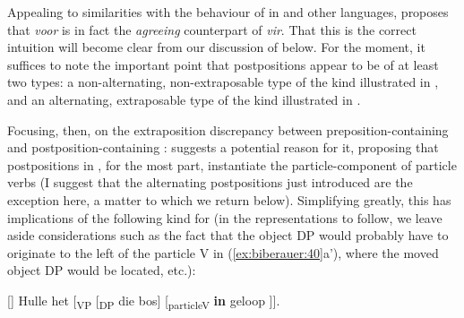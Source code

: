 \documentclass[output=paper]{LSP/langsci}
\begin{document}
Appealing to similarities with the behaviour of  in  and other languages,  \citet{DeVos2013} proposes that \textit{voor} is in fact the \textit{agreeing} counterpart of \textit{vir}. That this is the correct intuition will become clear from our discussion of  below. For the moment, it suffices to note the important point that  postpositions appear to be of at least two types: a non-alternating, non-extraposable type of the kind illustrated in , and an alternating, extraposable type of the kind illustrated in .

Focusing, then, on the extraposition discrepancy between preposition-containing  and postposition-containing : \citet{Pretorius2015} suggests a potential reason for it, pro\-posing that postpositions in , for the most part, instantiate the particle-com\-ponent of particle verbs (I suggest that the alternating postpositions just introduced are the exception here, a matter to which we return below). Simplifying greatly, this has implications of the following kind for  (in the representations to follow, we leave aside considerations such as the fact that the object DP would probably have to originate to the left of the particle V in (\ref{ex:biberauer:40}a’), where the moved object DP would be located, etc.):

\label{ex:biberauer:40}
\begin{exe}
\ex
\begin{xlista}[a'.]

  []{  Hulle het   [\textsubscript{VP} [\textsubscript{DP} die bos]   [\textsubscript{particleV} \textbf{in} geloop{\rmfnm} ]].  }

    \end{xlista}
\end{exe}

\end{document}
